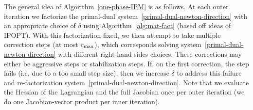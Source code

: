 \documentclass{article}
\begin{document}
The general idea of Algorithm~\ref{one-phase-IPM} is as follows. At each outer iteration we factorize the primal-dual system~\eqref{primal-dual-newton-direction} with an appropriate choice of $\delta$ using Algorithm~\ref{alg:mat-fact} (based off ideas of IPOPT). With this factorization fixed, we then attempt to take multiple correction steps (at most $c_{\max}$), which corresponds solving system~\ref{primal-dual-newton-direction} with different right hand sides choices. These corrections may either be aggressive steps or stabilization steps. If, on the first correction, the step fails (i.e. due to a too small step size), then we increase $\delta$ to address this failure and re-factorization system~\eqref{primal-dual-newton-direction}. Note that we evaluate the Hessian of the Lagrangian and the full Jacobian once per outer iteration (we do one Jacobian-vector product per inner iteration).


\end{document}
